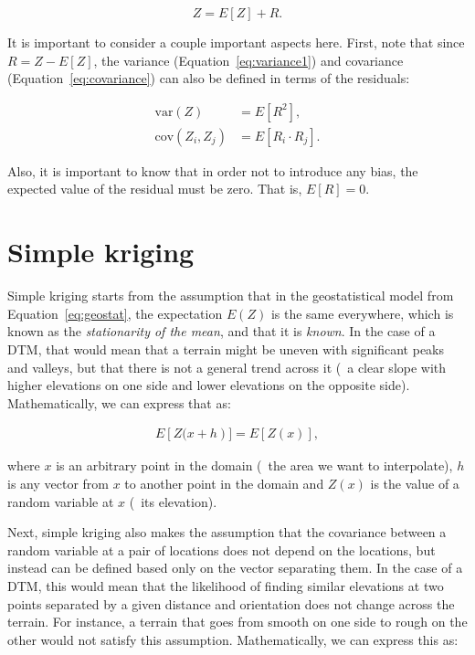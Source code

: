 \begin{equation}
\label{eq:geostat}
Z = E\left[Z\right] + R.
\end{equation}

It is important to consider a couple important aspects here.
First, note that since \(R = Z - E[Z] \), the variance (Equation~\ref{eq:variance1}) and covariance (Equation~\ref{eq:covariance}) can also be defined in terms of the residuals:

\begin{align}
\mathrm{var}\left(Z\right) &= E\left[{R}^2\right], \label{eq:varres} \\
\mathrm{cov}(Z_i,Z_j) &= E\left[R_i \cdot R_j\right]. \label{eq:covres}
\end{align}

Also, it is important to know that in order not to introduce any bias, the expected value of the residual must be zero.
That is, \(E\left[R\right] = 0\).

\section{Simple kriging}

Simple kriging starts from the assumption that in the geostatistical model from Equation~\ref{eq:geostat}, the expectation \(E(Z)\) is the same everywhere, which is known as the \emph{stationarity of the mean}, and that it is \emph{known}.
In the case of a DTM, that would mean that a terrain might be uneven with significant peaks and valleys, but that there is not a general trend across it (\eg\ a clear slope with higher elevations on one side and lower elevations on the opposite side).
Mathematically, we can express that as:

\begin{align}
\label{eq:expectationsk}
E\left[Z(x+h\right)] = E\left[Z(x)\right],
\end{align}

where \(x\) is an arbitrary point in the domain (\ie\ the area we want to interpolate), \(h\) is any vector from \(x\) to another point in the domain and \(Z(x)\) is the value of a random variable at \(x\) (\eg\ its elevation).

Next, simple kriging also makes the assumption that the covariance between a random variable at a pair of locations does not depend on the locations, but instead can be defined based only on the vector separating them.
In the case of a DTM, this would mean that the likelihood of finding similar elevations at two points separated by a given distance and orientation does not change across the terrain.
For instance, a terrain that goes from smooth on one side to rough on the other would not satisfy this assumption.
Mathematically, we can express this as:

